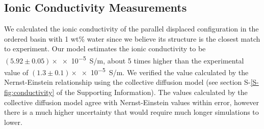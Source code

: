 \documentclass[journal=jpcbfk,manuscript=article]{achemso}
\begin{document}
  \subsection{Ionic Conductivity Measurements}
 

  
  
  
  We calculated the ionic conductivity of the parallel displaced configuration in
  the ordered basin with 1 wt\% water since we believe its structure is the 
  closest match to experiment. Our model estimates the ionic conductivity to be
  $(5.92 \pm 0.05)\times$\num{e-5}~S/m, about 5 times higher than the experimental value of 
  $(1.3 \pm 0.1)\times$\num{e-5}~S/m. We verified the value calculated by the Nernst-Einstein
  relationship using the collective diffusion model\cite{liu_collective_2013} 
  (see section S-\ref{S-fig:conductivity} of the Supporting Information). The values calculated by the 
  collective diffusion model agree with Nernst-Einstein values within error, 
  however there is a much higher uncertainty that would require much longer 
  simulations to lower.
  

\end{document}
